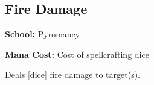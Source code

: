 \subsection{Fire Damage}

\noindent
\textbf{School:} Pyromancy

\noindent
\textbf{Mana Cost:} Cost of spellcrafting dice

Deals [dice] fire damage to target(s).

